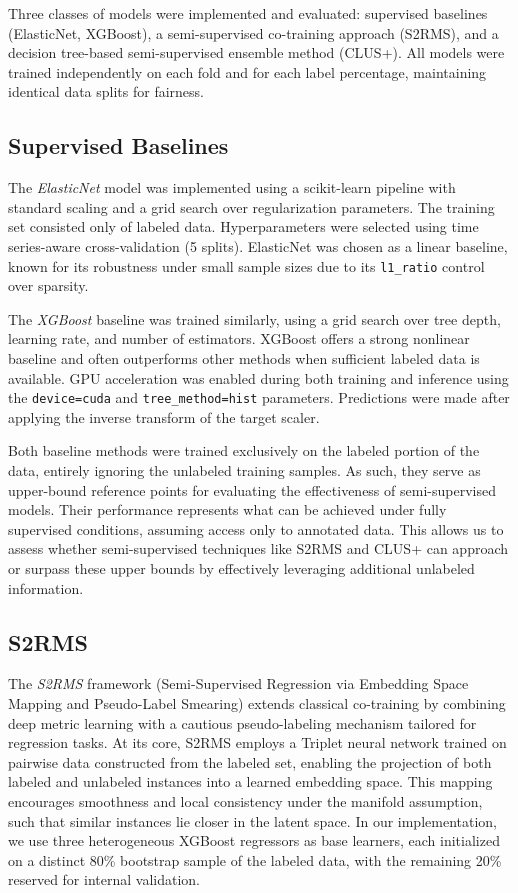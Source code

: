 Three classes of models were implemented and evaluated: supervised baselines (ElasticNet, XGBoost), a semi-supervised co-training approach (S2RMS), and a decision tree-based semi-supervised ensemble method (CLUS+). All models were trained independently on each fold and for each label percentage, maintaining identical data splits for fairness.

\subsection{Supervised Baselines}

The \textit{ElasticNet} model was implemented using a scikit-learn pipeline with standard scaling and a grid search over regularization parameters. The training set consisted only of labeled data. Hyperparameters were selected using time series-aware cross-validation (5 splits). ElasticNet was chosen as a linear baseline, known for its robustness under small sample sizes due to its \texttt{l1\_ratio} control over sparsity.

The \textit{XGBoost} baseline was trained similarly, using a grid search over tree depth, learning rate, and number of estimators. XGBoost offers a strong nonlinear baseline and often outperforms other methods when sufficient labeled data is available. GPU acceleration was enabled during both training and inference using the \texttt{device=cuda} and \texttt{tree\_method=hist} parameters. Predictions were made after applying the inverse transform of the target scaler.

Both baseline methods were trained exclusively on the labeled portion of the data, entirely ignoring the unlabeled training samples. As such, they serve as upper-bound reference points for evaluating the effectiveness of semi-supervised models. Their performance represents what can be achieved under fully supervised conditions, assuming access only to annotated data. This allows us to assess whether semi-supervised techniques like S2RMS and CLUS+ can approach or surpass these upper bounds by effectively leveraging additional unlabeled information.

\subsection{S2RMS}

The \textit{S2RMS} framework \cite{liu2024semi} (Semi-Supervised Regression via Embedding Space Mapping and Pseudo-Label Smearing) extends classical co-training by combining deep metric learning with a cautious pseudo-labeling mechanism tailored for regression tasks. At its core, S2RMS employs a Triplet neural network trained on pairwise data constructed from the labeled set, enabling the projection of both labeled and unlabeled instances into a learned embedding space. This mapping encourages smoothness and local consistency under the manifold assumption, such that similar instances lie closer in the latent space. In our implementation, we use three heterogeneous XGBoost regressors as base learners, each initialized on a distinct 80\% bootstrap sample of the labeled data, with the remaining 20\% reserved for internal validation.


